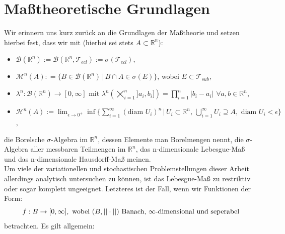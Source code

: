 \section{Maßtheoretische Grundlagen}{\label{sec:measure}}
Wir erinnern uns kurz zurück an die Grundlagen der Maßtheorie und setzen hierbei fest, dass wir mit (hierbei sei stets \(A \subset \mathbb{R}^n\)):
\begin{itemize}
\item
    \(\mathcal{B}(\mathbb{R}^n):=\mathcal{B}(\mathbb{R}^n,\mathcal{T}_{ecl}) := \sigma(\mathcal{T}_{ecl})\),
\item
    \(\mathcal{M}^n(A) : = \{B \in \mathcal{B}(\mathbb{R}^n) \, | \, B \cap A \in \sigma(E)\}\), wobei \(E \subset \mathcal{T}_{sub}\),
\item
    \(\lambda^n: \mathcal{B}(\mathbb{R}^n) \to [0,\infty] \text{ mit } \lambda^n(\bigtimes_{i=1}^n ]a_i,b_i]) = \prod_{i=1}^n |b_i - a_i| \, \, \forall a, b \in \mathbb{R}^n\),
\item
    \(\mathcal{H}^n(A) := \lim_{\epsilon \to 0^+} \inf \{\sum_{i=1}^{\infty} (\text{diam }U_i)^n \, | \, U_i \subset \mathbb{R}^n, \, \bigcup_{i=1}^{\infty} U_i \supseteq A, \text{ diam }U_i < \epsilon \}\),
\end{itemize}
die Borelsche \(\sigma\)-Algebra im \(\mathbb{R}^n\), dessen Elemente man Borelmengen nennt, die \(\sigma\)-Algebra aller messbaren Teilmengen im \(\mathbb{R}^n\), das n-dimensionale Lebesgue-Maß und das n-dimensionale Hausdorff-Maß meinen.\\
Um viele der variationellen und stochastischen Problemstellungen dieser Arbeit \\allerdings analytisch untersuchen zu können, ist das Lebesgue-Maß zu restriktiv oder sogar komplett ungeeignet. Letzteres ist der Fall, wenn wir Funktionen der Form:
\begin{equation}{\label{eq2.1}}
f:B \to [0,\infty],\text{ wobei }(B,||\cdot||) \text{ Banach, \(\infty\)-dimensional und seperabel}
\end{equation}
betrachten. Es gilt allgemein:\\[0.5cm]

